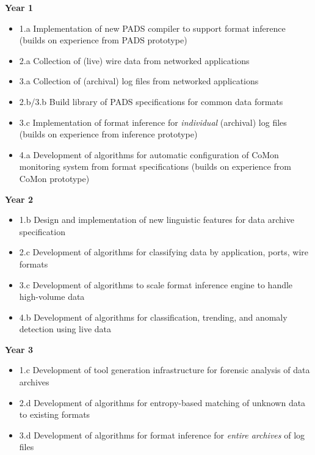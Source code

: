 

\noindent
{\bf Year 1}
\begin{itemize}
\item 1.a Implementation of new PADS compiler to support format inference 
(builds on experience from PADS prototype)
\item 2.a Collection of (live) wire data from networked applications
\item 3.a Collection of (archival) log files from networked applications
\item 2.b/3.b Build library of PADS specifications for common data formats
\item 3.c Implementation of format inference for {\em individual} (archival) log files
(builds on experience from inference prototype)
\item 4.a Development of algorithms for automatic configuration of CoMon monitoring system 
from format specifications (builds on experience from CoMon prototype)
\end{itemize}

\noindent
{\bf Year 2}
\begin{itemize}
\item 1.b Design and implementation of new linguistic features for data archive specification
\item 2.c Development of algorithms for classifying data by application, ports, wire formats
\item 3.c Development of algorithms to scale format inference engine to handle high-volume 
data
\item 4.b Development of algorithms for classification, trending, and 
anomaly detection using live data
\end{itemize}

\noindent
{\bf Year 3}
\begin{itemize}
\item 1.c Development of tool generation infrastructure for forensic analysis of data archives
\item 2.d Development of algorithms for entropy-based matching of unknown data to existing formats
\item 3.d Development of algorithms for format inference for {\em entire archives} of log files
\end{itemize}


